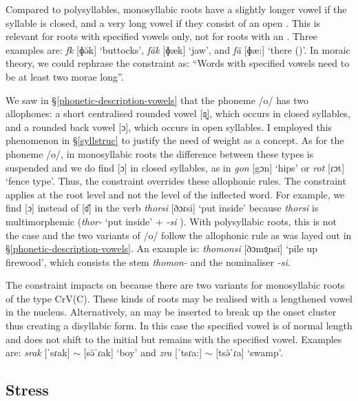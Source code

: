 Compared to polysyllables, monosyllabic roots have a slightly longer vowel if the syllable is closed, and a very long vowel if they consist of an open . This is relevant for roots with specified vowels only, not for roots with an . Three examples are: \emph{fk} [ɸə̆k] `buttocks', \emph{fäk} [ɸæk] `jaw', and \emph{fä} [ɸæ:] `there ({\Dist})'. In moraic theory, we could rephrase the  constraint as: ``Words with specified vowels need to be at least two morae long''.

We saw in {\S}\ref{phonetic-description-vowels} that the phoneme /o/ has two allophones: a short centralised rounded vowel [ɞ̯], which occurs in closed syllables, and a rounded back vowel [ɔ], which occurs in open syllables. I employed this phenomenon in {\S}\ref{syllstruc} to justify the need of  weight as a concept. As for the phoneme /o/, in monosyllabic roots the difference between these  types is suspended and we do find [ɔ] in closed syllables, as in \emph{gon} [{\ᵑ}gɔn] `hips' or \emph{rot} [ɾɔt] `fence type'. Thus, the  constraint overrides these allophonic rules. The constraint applies at the root level and not the level of the inflected word. For example, we find [ɔ] instead of [ɞ̆] in the verb \emph{thorsi} [ðɔɾsi] `put inside' because \emph{thorsi} is multimorphemic (\emph{thor-} `put inside' + \emph{-si} {\Nmlz}). With polysyllabic roots, this is not the case and the two variants of /o/ follow the allophonic rule as was layed out in {\S}\ref{phonetic-description-vowels}. An example is: \emph{thomonsi} [ðɔmɞ̯nsi] `pile up firewood', which consists the stem \emph{thomon-} and the nominaliser \emph{-si}.

The  constraint impacts on  because there are two variants for monosyllabic roots of the type CrV(C). These kinds of roots may be realised with a lengthened vowel in the nucleus. Alternatively, an  may be inserted to break up the onset cluster thus creating a disyllabic form. In this case the specified vowel is of normal length and  does not shift to the initial  but remains with the specified vowel. Examples are: \emph{srak} [ˈsɾak] $\sim$ [sə̆ˈɾak] `boy' and \emph{zra} [ˈtsɾa:] $\sim$ [tsə̆ˈɾa] `swamp'.

\subsection{Stress} \label{stress}

